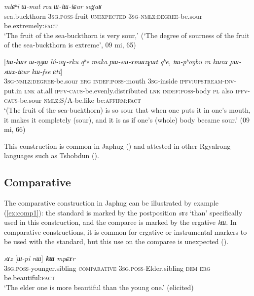 \documentclass[oneside,a4paper,11pt]{article}
\newcommand{\ipa}[1]{{\phon\textit{#1}}}
\begin{document}
\begin{exe}
\ex \label{ex:WtWCur}
\gll 
\ipa{mtɕʰi}  	\ipa{ɯ-mat}  	\ipa{rca}  	\ipa{ɯ-tɯ-tɕur}  	\ipa{saχaʁ}  	   \\
sea.buckthorn \textsc{3sg.poss}-fruit \textsc{unexpected} \textsc{3sg-nmlz:degree}-be.sour be.extremely:\textsc{fact}   \\
\glt `The fruit of the sea-buckthorn is very sour,' (`The degree of sourness of the fruit of the sea-buckthorn is extreme', 09 mi, 65)
\end{exe}

\begin{exe}
\ex \label{ex:YWsWxtCur}
\gll 
 	[\ipa{ɯ-tɯ-tɕur}]  	\ipa{\textbf{kɯ}}  	[\ipa{tɯ-kɯr}  	\ipa{ɯ-ŋgɯ}  	\ipa{lú-wɣ-rku}  	\ipa{qʰe}  	\ipa{maka}  	\ipa{ɲɯ-sɯ-ɤmɯzɣɯt}  	\ipa{qʰe,}  	\ipa{tɯ-pʰoŋbu}  	\ipa{ra}  	\ipa{kɯnɤ}  	\ipa{ɲɯ-sɯx-tɕur}  	\ipa{kɯ-fse}  	\ipa{ɕti}]  \\
  \textsc{3sg-nmlz:degree}-be.sour \textsc{erg} \textsc{indef:poss}-mouth \textsc{3sg}-inside \textsc{ipfv:upstream-inv}-put.in \textsc{lnk} at.all \textsc{ipfv-caus}-be.evenly.distributed \textsc{lnk} \textsc{indef:poss}-body \textsc{pl} also \textsc{ipfv-caus}-be.sour \textsc{nmlz:S/A}-be.like be:\textsc{affirm}:\textsc{fact} \\
\glt `(The fruit of the sea-buckthorn) is so sour that when one puts it in one's mouth, it makes it completely (sour), and it is as if one's (whole) body became sour.' (09 mi, 66)
\end{exe}

This construction is common in Japhug (\citealt[8]{jacques16comparative}) and attested in other Rgyalrong languages such as Tshobdun (\citealt[911]{jackson06guanxiju}).

\subsection{Comparative}
The comparative construction in Japhug can be illustrated by example (\ref{ex:comp1}): the  standard is marked by the postposition \ipa{sɤz} `than' specifically used in this construction, and the comparee is marked by the ergative  \ipa{kɯ}. In comparative constructions, it is common for ergative or instrumental markers to be used with the standard, but this use on the comparee is unexpected (\citealt{jacques16comparative}).

\begin{exe}
\ex \label{ex:comp1}
\gll  \ipa{ɯ-ʁi}   	\ipa{sɤz}   	[\ipa{ɯ-pi}   	\ipa{nɯ}]   	\ipa{\textbf{kɯ}}   	\ipa{mpɕɤr}     \\
\textsc{3sg.poss}-younger.sibling \textsc{comparative} \textsc{3sg.poss}-Elder.sibling \textsc{dem} \textsc{erg}  be.beautiful:\textsc{fact} \\
\glt `The elder one is more beautiful than the young one.' (elicited)
\end{exe}
\end{document}
